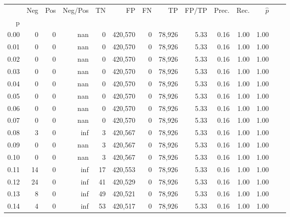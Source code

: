 \begin{tabular}{rrrrrrrrrrrrrr}
\toprule
{} &     Neg &    Pos & Neg/Pos &       TN &       FP &      FN &      TP & FP/TP & Prec. &  Rec. & $\hat{p}$ \\
p    &         &        &         &          &          &         &         &       &       &       &           \\
\midrule
0.00 &       0 &      0 &     nan &        0 &  420,570 &       0 &  78,926 &  5.33 &  0.16 &  1.00 &      1.00 \\
0.01 &       0 &      0 &     nan &        0 &  420,570 &       0 &  78,926 &  5.33 &  0.16 &  1.00 &      1.00 \\
0.02 &       0 &      0 &     nan &        0 &  420,570 &       0 &  78,926 &  5.33 &  0.16 &  1.00 &      1.00 \\
0.03 &       0 &      0 &     nan &        0 &  420,570 &       0 &  78,926 &  5.33 &  0.16 &  1.00 &      1.00 \\
0.04 &       0 &      0 &     nan &        0 &  420,570 &       0 &  78,926 &  5.33 &  0.16 &  1.00 &      1.00 \\
0.05 &       0 &      0 &     nan &        0 &  420,570 &       0 &  78,926 &  5.33 &  0.16 &  1.00 &      1.00 \\
0.06 &       0 &      0 &     nan &        0 &  420,570 &       0 &  78,926 &  5.33 &  0.16 &  1.00 &      1.00 \\
0.07 &       0 &      0 &     nan &        0 &  420,570 &       0 &  78,926 &  5.33 &  0.16 &  1.00 &      1.00 \\
0.08 &       3 &      0 &     inf &        3 &  420,567 &       0 &  78,926 &  5.33 &  0.16 &  1.00 &      1.00 \\
0.09 &       0 &      0 &     nan &        3 &  420,567 &       0 &  78,926 &  5.33 &  0.16 &  1.00 &      1.00 \\
0.10 &       0 &      0 &     nan &        3 &  420,567 &       0 &  78,926 &  5.33 &  0.16 &  1.00 &      1.00 \\
0.11 &      14 &      0 &     inf &       17 &  420,553 &       0 &  78,926 &  5.33 &  0.16 &  1.00 &      1.00 \\
0.12 &      24 &      0 &     inf &       41 &  420,529 &       0 &  78,926 &  5.33 &  0.16 &  1.00 &      1.00 \\
0.13 &       8 &      0 &     inf &       49 &  420,521 &       0 &  78,926 &  5.33 &  0.16 &  1.00 &      1.00 \\
0.14 &       4 &      0 &     inf &       53 &  420,517 &       0 &  78,926 &  5.33 &  0.16 &  1.00 &      1.00 \\

\end{tabular}
